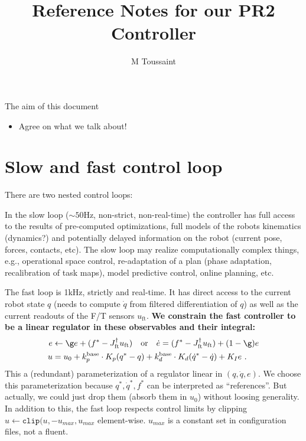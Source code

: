 \documentclass[10pt,fleqn,twoside]{article}
\title{Reference Notes for our PR2 Controller}
\author{M Toussaint}
\newcommand{\ft}{\text{ft}}
\begin{document}
\maketitle
\tableofcontents

The aim of this document
\begin{itemize}
\item Agree on what we talk about!
\end{itemize}


\section{Slow and fast control loop}

There are two nested control loops:

In the slow loop ($\sim 50$Hz, non-strict, non-real-time) the
controller has full access to the results of pre-computed
optimizations, full models of the robots kinematics (dynamics?) and
potentially delayed information on the robot (current pose, forces,
contacts, etc). The slow loop may realize computationally complex
things, e.g., operational space control, re-adaptation of a plan
(phase adaptation, recalibration of task maps), model predictive
control, online planning, etc.

The fast loop is 1kHz, strictly and real-time. It has direct access to
the current robot state $q$ (needs to compute $\dot q$ from filtered
differentiation of $q$) as well as the current readouts of the F/T
sensors $u_\ft$. \textbf{We constrain the fast controller to be a linear
regulator in these observables and their integral:}
\begin{align}
e
&\gets \g e + (f^* - J_\ft^\dag u_\ft)
  \quad\text{or}\quad \dot e = (f^*-J_\ft^\dag u_\ft) + (1-\g)e\\
u
&= u_0 + k_p^\text{base} \cdot K_p (q^* - q) + k_d^\text{base} \cdot K_d (\dot q^* - \dot q) + K_I e ~.
\end{align}
This a (redundant) parameterization of a regulator linear in $(q, \dot
q, e)$. We choose this parameterization because $q^*, \dot q^*, f^*$
can be interpreted as ``references''. But actually, we could just drop
them (absorb them in $u_0$) without loosing generality. In addition to
this, the fast loop respects control limits by clipping
$u \gets \texttt{clip}(u, -u_{max}, u_{max}$ element-wise. $u_{max}$
is a constant set in configuration files, not a
fluent. 
\end{document}
